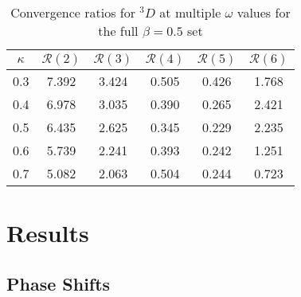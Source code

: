 \documentclass[Dissertation.tex]{subfiles}
\begin{document}
\begin{table}[H]
\centering
\begin{tabular}{cccccc}
\toprule
$\kappa$ & $\mathcal{R}(2)$ & $\mathcal{R}(3)$ & $\mathcal{R}(4)$ & $\mathcal{R}(5)$ & $\mathcal{R}(6)$ \\
\midrule
0.3 & 7.392 & 3.424 & 0.505 & 0.426 & 1.768 \\
0.4 & 6.978 & 3.035 & 0.390 & 0.265 & 2.421 \\
0.5 & 6.435 & 2.625 & 0.345 & 0.229 & 2.235 \\
0.6 & 5.739 & 2.241 & 0.393 & 0.242 & 1.251 \\
0.7 & 5.082 & 2.063 & 0.504 & 0.244 & 0.723 \\
\bottomrule
\end{tabular}
\caption{Convergence ratios for $^3D$ at multiple $\omega$ values for the full $\beta = 0.5$ set}
\label{tab:D3Beta5VarConv}
\end{table}



\section{Results}
\label{sec:DWaveResults}

\subsection{Phase Shifts}
\label{sec:DWavePhase}
\end{document}
